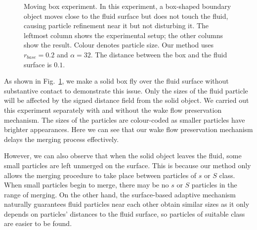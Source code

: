 \documentclass[VANCOUVER,STIX1COL]{WileyNJD-v2}
\begin{document}
\begin{figure}[h]
    \centering
    \vspace{-0.7\baselineskip}
    \caption{Moving box experiment. In this experiment, a box-shaped boundary object moves close to the fluid surface but does not touch the fluid, causing particle refinement near it but not disturbing it. The leftmost column shows the experimental setup; the other columns show the result. Colour denotes particle size. Our method uses $r_{base} = 0.2$ and $\alpha = 32$. The distance between the box and the fluid surface is $0.1$.}
    \label{fig:fly_box}
\end{figure}
 
As shown in Fig.~\ref{fig:fly_box}, we make a solid box fly over the fluid surface without substantive contact to demonstrate this issue. Only the sizes of the fluid particle will be affected by the signed distance field from the solid object. We carried out this experiment separately with and without the wake flow preservation mechanism. The sizes of the particles are colour-coded as smaller particles have brighter appearances. Here we can see that our wake flow preservation mechanism delays the merging process effectively.

However, we can also observe that when the solid object leaves the fluid, some small particles are left unmerged on the surface. This is because our method only allows the merging procedure to take place between particles of $s$ or $S$ class. When small particles begin to merge, there may be no $s$ or $S$ particles in the range of merging. On the other hand, the surface-based adaptive mechanism naturally guarantees fluid particles near each other obtain similar sizes as it only depends on particles' distances to the fluid surface, so particles of suitable class are easier to be found. 
\end{document}
